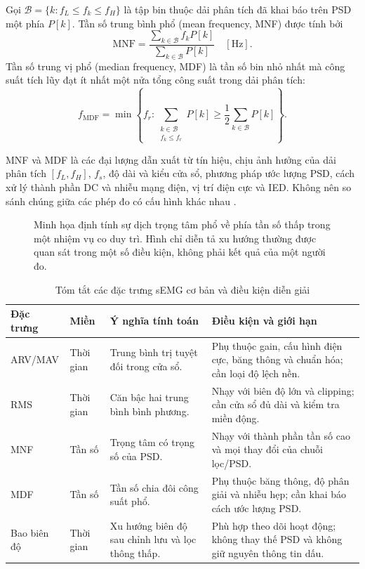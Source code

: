 Gọi $\mathcal{B}=\{k:f_L\leq f_k\leq f_H\}$ là tập bin thuộc dải phân
tích đã khai báo trên PSD một phía $P[k]$. Tần số trung bình phổ (mean
frequency, MNF) được tính bởi
\begin{equation}
\label{eq:mnf}
\mathrm{MNF}
=\frac{\displaystyle\sum_{k\in\mathcal{B}} f_kP[k]}
       {\displaystyle\sum_{k\in\mathcal{B}} P[k]}
\quad[\mathrm{Hz}].
\end{equation}
Tần số trung vị phổ (median frequency, MDF) là tần số bin nhỏ nhất mà công
suất tích lũy đạt ít nhất một nửa tổng công suất trong dải phân tích:
\begin{equation}
\label{eq:mdf}
f_{\mathrm{MDF}}
=\min\!\left\{
f_r:
\sum_{\substack{k\in\mathcal{B}\\ f_k\leq f_r}} P[k]
\geq \frac{1}{2}\sum_{k\in\mathcal{B}}P[k]
\right\}.
\end{equation}

MNF và MDF là các đại lượng dẫn xuất từ tín hiệu, chịu ảnh hưởng của dải
phân tích $[f_L,f_H]$, $f_s$, độ dài và kiểu cửa sổ, phương pháp ước lượng
PSD, cách xử lý thành phần DC và nhiễu mạng điện, vị trí điện cực và IED.
Không nên so sánh chúng giữa các phép đo có cấu hình khác nhau
\cite{muceli2024tutorial,merletti1999standards,mcmanus2020analysis}.

\begin{figure}[htbp]
    \centering
    
    \caption{Minh họa định tính sự dịch trọng tâm phổ về phía tần số thấp
    trong một nhiệm vụ co duy trì. Hình chỉ diễn tả xu hướng thường được
    quan sát trong một số điều kiện, không phải kết quả của một người đo.}
    \label{fig:spectral-fatigue}
\end{figure}

\begin{table}[htbp]
\centering
\caption{Tóm tắt các đặc trưng sEMG cơ bản và điều kiện diễn giải}
\label{tab:feature-summary}
\begin{tabularx}{\textwidth}{@{}P{2.5cm}P{3.1cm}Y Y@{}}
\toprule
\textbf{Đặc trưng} & \textbf{Miền} & \textbf{Ý nghĩa tính toán} & \textbf{Điều kiện và giới hạn} \\
\midrule
ARV/MAV & Thời gian & Trung bình trị tuyệt đối trong cửa sổ. & Phụ thuộc gain, cấu hình điện cực, băng thông và chuẩn hóa; cần loại độ lệch nền. \\
RMS & Thời gian & Căn bậc hai trung bình bình phương. & Nhạy với biên độ lớn và clipping; cần cửa sổ đủ dài và kiểm tra miền động. \\
MNF & Tần số & Trọng tâm có trọng số của PSD. & Nhạy với thành phần tần số cao và mọi thay đổi của chuỗi lọc/PSD. \\
MDF & Tần số & Tần số chia đôi công suất phổ. & Phụ thuộc băng thông, độ phân giải và nhiễu hẹp; cần khai báo cách ước lượng PSD. \\
Bao biên độ & Thời gian & Xu hướng biên độ sau chỉnh lưu và lọc thông thấp. & Phù hợp theo dõi hoạt động; không thay thế PSD và không giữ nguyên thông tin dấu. \\
\bottomrule
\end{tabularx}
\end{table}

